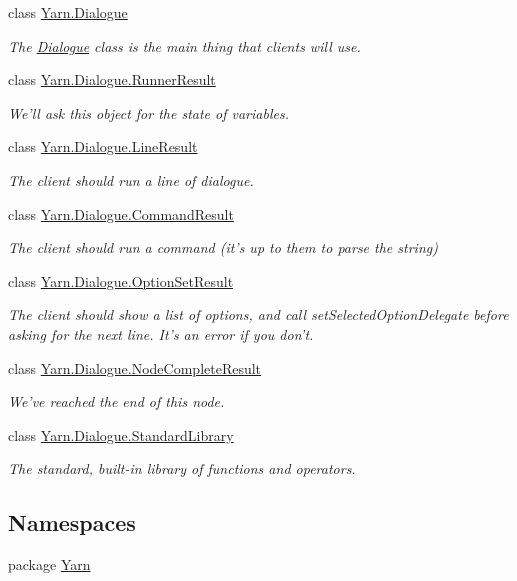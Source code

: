 \begin{DoxyCompactItemize}
class \hyperlink{a00088}{Yarn.\-Dialogue}
\begin{DoxyCompactList}\small\item\em The \hyperlink{a00088}{Dialogue} class is the main thing that clients will use. \end{DoxyCompactList}\item 
class \hyperlink{a00141}{Yarn.\-Dialogue.\-Runner\-Result}
\begin{DoxyCompactList}\small\item\em We'll ask this object for the state of variables. \end{DoxyCompactList}\item 
class \hyperlink{a00124}{Yarn.\-Dialogue.\-Line\-Result}
\begin{DoxyCompactList}\small\item\em The client should run a line of dialogue. \end{DoxyCompactList}\item 
class \hyperlink{a00049}{Yarn.\-Dialogue.\-Command\-Result}
\begin{DoxyCompactList}\small\item\em The client should run a command (it's up to them to parse the string) \end{DoxyCompactList}\item 
class \hyperlink{a00134}{Yarn.\-Dialogue.\-Option\-Set\-Result}
\begin{DoxyCompactList}\small\item\em The client should show a list of options, and call set\-Selected\-Option\-Delegate before asking for the next line. It's an error if you don't. \end{DoxyCompactList}\item 
class \hyperlink{a00130}{Yarn.\-Dialogue.\-Node\-Complete\-Result}
\begin{DoxyCompactList}\small\item\em We've reached the end of this node. \end{DoxyCompactList}\item 
class \hyperlink{a00147}{Yarn.\-Dialogue.\-Standard\-Library}
\begin{DoxyCompactList}\small\item\em The standard, built-\/in library of functions and operators. \end{DoxyCompactList}\end{DoxyCompactItemize}
\subsection*{Namespaces}
\begin{DoxyCompactItemize}
\item 
package \hyperlink{a00048}{Yarn}
\end{DoxyCompactItemize}
